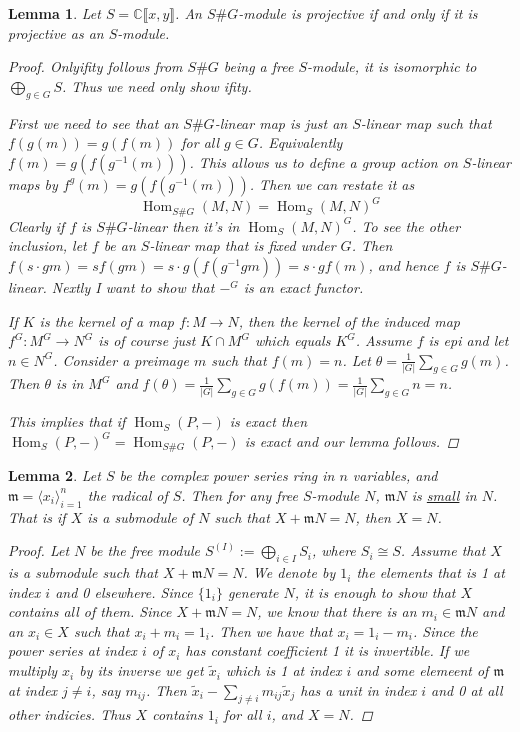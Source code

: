 \documentclass[11pt, a4paper, english]{article}
\numberwithin{prop}{section}
\newtheorem{lemma}{Lemma}
\numberwithin{lemma}{section}
\numberwithin{theorem}{section}
\numberwithin{defin}{section}
\numberwithin{example}{section}
\newcommand{\C}{\mathbb{C}}
\DeclareMathOperator{\Hom}{Hom}
\begin{document}
\begin{lemma}
\label{lem:S proj => SG proj}
Let $S = \C\llbracket x, y \rrbracket$. An $S\#G$-module is projective if and only if it is projective as an $S$-module.

\begin{proof}
Onlyifity follows from $S\#G$ being a free $S$-module, it is isomorphic to $\bigoplus_{g \in G} S$. Thus we need only show ifity.

First we need to see that an $S\#G$-linear map is just an $S$-linear map such that $f(g(m))=g(f(m))$ for all $g \in G$. Equivalently $f(m) = g(f(g^{-1}(m)))$. This allows us to define a group action on $S$-linear maps by $f^g(m) = g(f(g^{-1}(m)))$. Then we can restate it as $$ \Hom_{S\#G}(M,N) = \Hom_S(M,N)^G$$
Clearly if $f$ is $S\#G$-linear then it's in $\Hom_S(M,N)^G$. To see the other inclusion, let $f$ be an $S$-linear map that is fixed under $G$. Then $f(s\cdot g m) = s f(g m) = s\cdot g(f(g^{-1} g m)) = s \cdot g f(m) $, and hence $f$ is $S\#G$-linear. Nextly I want to show that $-^G$ is an exact functor.

If $K$ is the kernel of a map $f: M \to N$, then the kernel of the induced map $f^G : M^G \to N^G$ is of course just $K \cap M^G$ which equals $K^G$. Assume $f$ is epi and let $n \in N^G$. Consider a preimage $m$ such that $f(m)=n$. Let $\theta = \frac{1}{|G|}\sum_{g \in G} g(m)$. Then $\theta$ is in $M^G$ and $f(\theta) = \frac{1}{|G|}\sum_{g \in G} g(f(m)) = \frac{1}{|G|}\sum_{g \in G} n = n$.

This implies that if $\Hom_S(P, -)$ is exact then $\Hom_S(P, -)^G = \Hom_{S\#G}(P, -)$ is exact and our lemma follows.
\end{proof}
\end{lemma}

\begin{lemma}
\label{lem:radical small}
Let $S$ be the complex power series ring in $n$ variables, and $\mathfrak{m} = \langle x_i \rangle_{i=1}^n$ the radical of $S$. Then for any free $S$-module $N$, $\mathfrak{m}N$ is \underline{small} in $N$. That is if $X$ is  a submodule of $N$ such that $X + \mathfrak{m}N = N$, then $X = N$.

\begin{proof}
Let $N$ be the free module $S^{(I)} := \bigoplus\limits_{i \in I} S_i$, where $S_i \cong S$. Assume that $X$ is a submodule such that $X + \mathfrak{m}N = N$. We denote by $1_i$ the elements that is 1 at index $i$ and 0 elsewhere. Since $\{ 1_i \}$ generate $N$, it is enough to show that $X$ contains all of them. Since $X + \mathfrak{m}N = N$, we know that there is an $m_i \in \mathfrak{m}N$ and an $x_i \in X$ such that $x_i + m_i = 1_i$. Then we have that $x_i = 1_i - m_i$. Since the power series at index $i$ of $x_i$ has constant coefficient 1 it is invertible. If we multiply $x_i$ by its inverse we get $\tilde{x}_i$ which is 1 at index $i$ and some elemeent of $\mathfrak{m}$ at index $j \neq i$, say $m_{ij}$. Then $\tilde{x}_i - \sum\limits_{j \neq i} m_{ij}\tilde{x}_j$ has a unit in index $i$ and 0 at all other indicies. Thus $X$ contains $1_i$ for all $i$, and $X = N$.
\end{proof}
\end{lemma}
\end{document}
